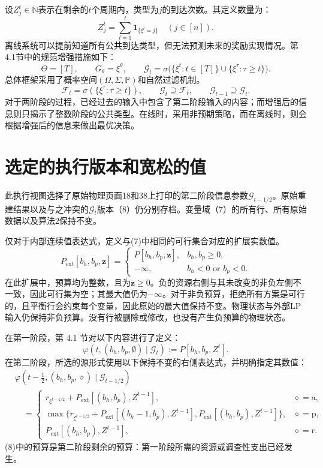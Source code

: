\documentclass{article}
\begin{document}
设$Z_j^t\in\mathbb N$表示在剩余的$t$个周期内，类型为$j$的到达次数。其定义数量为：
\[
Z_j^t=\sum_{l=1}^{t}\mathbf1_{\{\xi^l=j\}}
\quad(j\in[n]).
\]
离线系统可以提前知道所有公共到达类型，但无法预测未来的奖励实现情况。第4.1节中的规范增强措施如下：
\[
\Theta=[T],\qquad G_\theta=\xi^\theta,
\qquad
\mathcal G_t=\sigma\bigl(\{\xi^t:t\in[T]\}\cup
\{\xi^\tau:\tau\ge t\}\bigr).
\]
总体框架采用了概率空间$(\Omega,\Sigma,\mathbb P)$和自然过滤机制。
\[
\mathcal F_t=\sigma(\{\xi^\tau:\tau\ge t\}),
\qquad
\mathcal G_t\supseteq\mathcal F_t,
\qquad
\mathcal G_{t-1}\supseteq\mathcal G_t.
\]
对于两阶段的过程，已经过去的输入中包含了第二阶段输入的内容；而增强后的信息则只揭示了整数阶段的公共类型。在线时，采用非预期策略，而在离线时，则会根据增强后的信息来做出最优决策。

\section*{选定的执行版本和宽松的值}
此执行视图选择了原始物理页面18和38上打印的第二阶段信息参数$\mathcal G_{t-1/2}$。原始重建结果以及与之冲突的$\mathcal G_t$版本（8）仍分别存档。变量域（7）的所有行、所有原始数据以及算法2保持不变。

仅对于内部连续值表达式，定义与(7)中相同的可行集合对应的扩展实数值。
\[
P_{\mathrm{ext}}[b_h,b_p,\mathbf z]=
\begin{cases}
P[b_h,b_p,\mathbf z],&b_h,b_p\ge0,\\
-\infty,&b_h<0\text{ or }b_p<0.
\end{cases}
\]
在此扩展中，预算均为整数，且为$\mathbf z\ge0$。负的资源右侧与其未改变的非负左侧不一致，因此可行集为空；其最大值仍为$-\infty$。对于非负预算，拒绝所有方案是可行的，且平衡行会约束每个变量，因此原始的最大值保持不变。物理状态与外部LP输入仍保持非负预算。没有行被删除或修改，也没有产生负预算的物理状态。

在第一阶段，第 4.1 节对以下内容进行了定义：
\[
\varphi(t,(b_h,b_p,\emptyset)\mid\mathcal G_t)
:=P[b_h,b_p,Z^t].
\]
在第二阶段，所选的源形式使用以下保持不变的右侧表达式，并明确指定其数值：
\begin{equation}
\begin{aligned}
&\varphi(t-\tfrac12,(b_h,b_p,\diamond)\mid\mathcal G_{t-1/2})\\
&\quad=\begin{cases}
r_{\xi^{t-1/2}}+P_{\mathrm{ext}}[(b_h,b_p),Z^{t-1}],
 &\diamond=\mathrm a,\\[2pt]
\max\{r_{\xi^{t-1/2}}+P_{\mathrm{ext}}[(b_h-1,b_p),Z^{t-1}],
       P_{\mathrm{ext}}[(b_h,b_p),Z^{t-1}]\},
 &\diamond=\mathrm p,\\[2pt]
P_{\mathrm{ext}}[(b_h,b_p),Z^{t-1}],
 &\diamond=\mathrm r.
\end{cases}
\end{aligned}\tag{8}
\end{equation}
(8)中的预算是第二阶段剩余的预算：第一阶段所需的资源或调查性支出已经发生。
\end{document}
